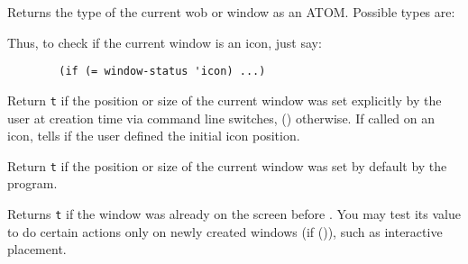         

Returns the type of the current wob or window as an ATOM. Possible types
are:


Thus, to check if the current window is an icon, just say:
{\exemplefont\begin{verbatim} 
        (if (= window-status 'icon) ...)
\end{verbatim}}

        

Return \verb"t" if the position or size of the current window was set
explicitly by the user at creation time via command line switches, ()
otherwise. If called on an icon, tells if the user defined the initial icon
position.

        

Return \verb"t" if the position or size of the current window was set
by default by the program.

        

Returns \verb"t" if the window was already on the screen before {\GWM}.  You may test
its value to do certain actions only on newly created windows (if ()), such
as interactive placement.

        

